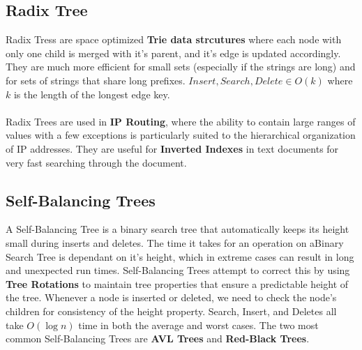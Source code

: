 \documentclass{article}
\begin{document}
\subsection{Radix Tree}
Radix Tress are space optimized {\bf Trie data strcutures} where each node with only one child is merged with it's parent, and it's edge is updated accordingly. They are much more efficient for small sets (especially if the strings are long) and for sets of strings that share long prefixes. $Insert, Search, Delete \in O(k)$ where $k$ is the length of the longest edge key.
\\ \\
Radix Trees are used in {\bf IP Routing}, where the ability to contain large ranges of values with a few exceptions is particularly suited to the hierarchical organization of IP addresses. They are useful for {\bf Inverted Indexes} in text documents for very fast searching through the document.
\begin{figure}[h]
\centering
{}
\end{figure}



\subsection{Self-Balancing Trees}

A Self-Balancing Tree is a binary search tree that automatically keeps its height small during inserts and deletes. The time it takes for an operation on aBinary Search Tree is dependant on it's height, which in extreme cases can result in long and unexpected run times. Self-Balancing Trees attempt to correct this by using {\bf Tree Rotations} to maintain tree properties that ensure a predictable height of the tree. Whenever a node is inserted or deleted, we need to check the node's children for consistency of the height property. Search, Insert, and Deletes all take $O(\log n)$ time in both the average and worst cases. The two most common Self-Balancing Trees are {\bf AVL Trees} and {\bf Red-Black Trees}.
\end{document}
